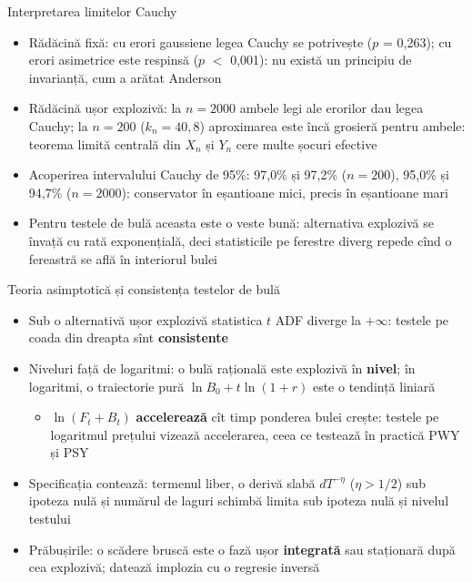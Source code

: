 \begin{frame}{Interpretarea limitelor Cauchy}
\itemsize{\small}
\begin{itemize}
    \item Rădăcină fixă: cu erori gaussiene legea Cauchy se potrivește ($p$ = 0{,}263); cu erori asimetrice este respinsă ($p$ $<$ 0{,}001): nu există un principiu de invarianță, cum a arătat Anderson
    \item Rădăcină ușor explozivă: la $n = 2000$ ambele legi ale erorilor dau legea Cauchy; la $n = 200$ ($k_n = 40{,}8$) aproximarea este încă grosieră pentru ambele: teorema limită centrală din $X_n$ și $Y_n$ cere multe șocuri efective
    \item Acoperirea intervalului Cauchy de 95\%: 97{,}0\% și 97{,}2\% ($n = 200$), 95{,}0\% și 94{,}7\% ($n = 2000$): conservator în eșantioane mici, precis în eșantioane mari
    \item Pentru testele de bulă aceasta este o veste bună: alternativa explozivă se învață cu rată exponențială, deci statisticile pe ferestre diverg repede cînd o fereastră se află în interiorul bulei
\end{itemize}
\end{frame}

\begin{frame}{Teoria asimptotică și consistența testelor de bulă}
\itemsize{\small}
\begin{itemize}
    \item Sub o alternativă ușor explozivă statistica $t$ ADF diverge la $+\infty$: testele pe coada din dreapta sînt \textbf{consistente} 
    \item Niveluri față de logaritmi: o bulă rațională este explozivă în \textbf{nivel}; în logaritmi, o traiectorie pură $\ln B_0 + t\ln(1 + r)$ este o tendință liniară
    \begin{itemize}
        \item $\ln(F_t + B_t)$ \textbf{accelerează} cît timp ponderea bulei crește: testele pe logaritmul prețului vizează accelerarea, ceea ce testează în practică PWY și PSY
    \end{itemize}
    \item Specificația contează: termenul liber, o derivă slabă $dT^{-\eta}$ ($\eta > 1/2$) sub ipoteza nulă și numărul de laguri schimbă limita sub ipoteza nulă și nivelul testului 
    \item Prăbușirile: o scădere bruscă este o fază ușor \textbf{integrată} sau staționară după cea explozivă;  datează implozia cu o regresie inversă
\end{itemize}
\end{frame}

